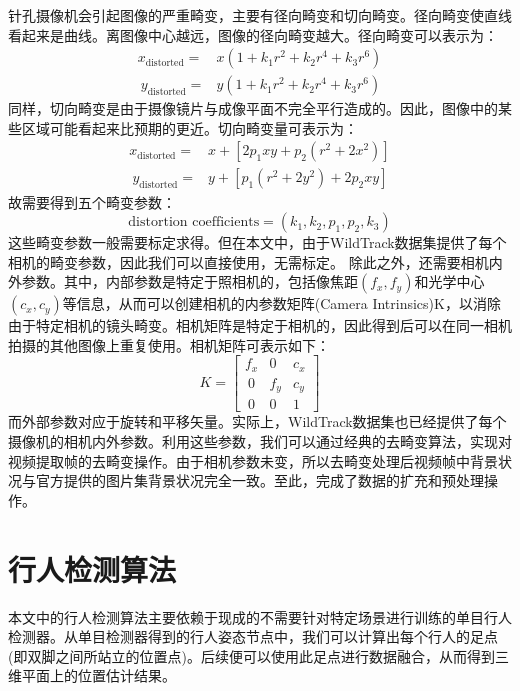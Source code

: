 针孔摄像机会引起图像的严重畸变，主要有径向畸变和切向畸变。径向畸变使直线看起来是曲线。离图像中心越远，图像的径向畸变越大。径向畸变可以表示为：
$$
\begin{aligned}
x_{\text{distorted}} = & x(1+k_{1}r^{2}+k_{2}r^{4}+k_{3}r^{6}) \\\
y_{\text{distorted}} = & y(1+k_{1}r^{2}+k_{2}r^{4}+k_{3}r^{6})
\end{aligned}
$$
同样，切向畸变是由于摄像镜片与成像平面不完全平行造成的。因此，图像中的某些区域可能看起来比预期的更近。切向畸变量可表示为：
$$
\begin{aligned}
x_{\text{distorted}} = & x+[2p_{1}xy+p_{2}(r^{2}+2x^{2})] \\\
y_{\text{distorted}} = & y+[p_{1}(r^{2}+2y^{2})+2p_{2}xy]
\end{aligned}
$$
故需要得到五个畸变参数：
$$
\text{distortion coefficients} = (k_{1}, k_{2}, p_{1}, p_{2}, k_{3})
$$
这些畸变参数一般需要标定求得。但在本文中，由于WildTrack数据集提供了每个相机的畸变参数，因此我们可以直接使用，无需标定。
除此之外，还需要相机内外参数。其中，内部参数是特定于照相机的，包括像焦距$(f_{x},f_{y})$和光学中心$(c_{x},c_{y})$等信息，从而可以创建相机的内参数矩阵(Camera Intrinsics)K，以消除由于特定相机的镜头畸变。相机矩阵是特定于相机的，因此得到后可以在同一相机拍摄的其他图像上重复使用。相机矩阵可表示如下：
$$
K=
\left[
\begin{matrix}
f_{x} & 0 & c_{x} \\\
0 & f_{y} & c_{y} \\\
0 & 0  & 1
\end{matrix}
\right]
$$
而外部参数对应于旋转和平移矢量。实际上，WildTrack数据集也已经提供了每个摄像机的相机内外参数。利用这些参数，我们可以通过经典的去畸变算法，实现对视频提取帧的去畸变操作。由于相机参数未变，所以去畸变处理后视频帧中背景状况与官方提供的图片集背景状况完全一致。至此，完成了数据的扩充和预处理操作。

\section{行人检测算法}

本文中的行人检测算法主要依赖于现成的不需要针对特定场景进行训练的单目行人检测器。从单目检测器得到的行人姿态节点中，我们可以计算出每个行人的足点(即双脚之间所站立的位置点)。后续便可以使用此足点进行数据融合，从而得到三维平面上的位置估计结果。

